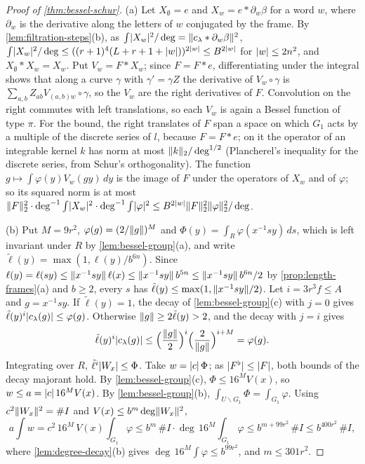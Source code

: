 \begin{proof}[Proof of \cref{thm:bessel-schur}]
(a) Let $X_\emptyset=e$ and $X_w=e*\partial_w\beta$ for a word $w$, where $\partial_w$ is the derivative along the letters of $w$ conjugated by the frame. By \cref{lem:filtration-steps}(b), as $\int\lvert X_w\rvert^2/\deg=\lVert c_\lambda*\partial_w\beta\rVert^2$,
$\int\lvert X_w\rvert^2/\deg\le((r+1)^4(L+r+1+\lvert w\rvert))^{2\lvert w\rvert}\le B^{2\lvert w\rvert}$ for $\lvert w\rvert\le2n^2$, and $X_\emptyset*X_w=X_w$. Put $V_w=F*X_w$; since $F=F*e$, differentiating under the integral shows that along a curve
$\gamma$ with $\gamma'=\gamma Z$ the derivative of $V_w\circ\gamma$ is $\sum_{a,b}Z_{ab}V_{(a,b)w}\circ\gamma$, so the $V_w$ are the right derivatives of $F$. Convolution on the right commutes with left translations, so
each $V_w$ is again a Bessel function of type $\pi$. For the bound, the right translates of $F$ span a space on which $G_1$ acts by a multiple of the discrete series of $l$, because $F=F*e$; on it the operator of an
integrable kernel $k$ has norm at most $\lVert k\rVert_2/\deg^{1/2}$ (Plancherel's inequality for the discrete series, from Schur's orthogonality). The function $g\mapsto\int\varphi(y)V_w(gy)\,dy$ is the image of $F$ under the
operators of $X_w$ and of $\varphi$; so its squared norm is at most $\lVert F\rVert_2^2\cdot\deg^{-1}\int\lvert X_w\rvert^2\cdot\deg^{-1}\int\lvert \varphi\rvert^2\le B^{2\lvert w\rvert}\lVert F\rVert_2^2\lVert \varphi\rVert_2^2/\deg$.

(b) Put $M=9r^2$, $\varphi(g)=(2/\lVert g\rVert)^M$ and $\Phi(y)=\int_R\varphi(x^{-1}sy)\,ds$, which is left invariant under $R$ by \cref{lem:bessel-group}(a), and write $\tilde\ell(y)=\max(1,\ell(y)/b^{6n})$. Since
$\ell(y)=\ell(sy)\le\lVert x^{-1}sy\rVert\,\ell(x)\le\lVert x^{-1}sy\rVert\,b^{5n}\le\lVert x^{-1}sy\rVert\,b^{6n}/2$ by \cref{prop:length-frames}(a) and $b\ge2$, every $s$ has $\tilde\ell(y)\le\max(1,\lVert x^{-1}sy\rVert/2)$. Let $i=3r^3f\le A$ and $g=x^{-1}sy$. If $\tilde\ell(y)=1$, the decay of \cref{lem:bessel-group}(c) with $j=0$ gives $\tilde\ell(y)^i\lvert c_\lambda(g)\rvert\le\varphi(g)$. Otherwise $\lVert g\rVert\ge2\tilde\ell(y)>2$, and the decay with $j=i$
gives
\[
  \tilde\ell(y)^i\lvert c_\lambda(g)\rvert\le\Bigl(\frac{\lVert g\rVert}2\Bigr)^i\Bigl(\frac2{\lVert g\rVert}\Bigr)^{i+M}=\varphi(g).
\] Integrating over $R$, $\tilde\ell^i\lvert W_x\rvert\le\Phi$. Take $w=\lvert c\rvert\,\Phi$; as $\lvert F^\flat\rvert\le\lvert F\rvert$, both bounds of the decay majorant hold. By \cref{lem:bessel-group}(c), $\Phi\le16^MV(x)$, so $w\le a=\lvert c\rvert\,16^MV(x)$.
By \cref{lem:bessel-group}(b), $\int_{U\backslash G_1}\Phi=\int_{G_1}\varphi$. Using $c^2\lVert W_x\rVert^2=\#I$ and $V(x)\le b^m\deg\lVert W_x\rVert^2$,
\[
  a\int w=c^2\,16^M\,V(x)\int_{G_1}\varphi\le b^m\,\#I\cdot\deg\,16^M\int_{G_1}\varphi\le b^{m+99r^2}\,\#I\le b^{400r^2}\,\#I,
\]
where \cref{lem:degree-decay}(b) gives $\deg\,16^M\int\varphi\le b^{99r^2}$, and $m\le301r^2$.


\end{proof}
